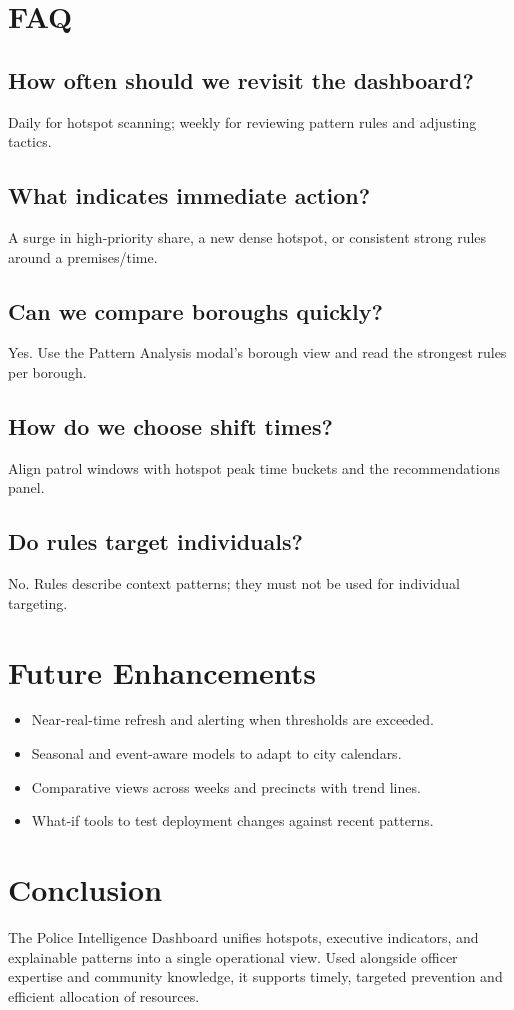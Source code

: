 \documentclass[11pt]{article}
\begin{document}
\section{FAQ}

\subsection*{How often should we revisit the dashboard?}
Daily for hotspot scanning; weekly for reviewing pattern rules and adjusting tactics.

\subsection*{What indicates immediate action?}
A surge in high-priority share, a new dense hotspot, or consistent strong rules around a premises/time.

\subsection*{Can we compare boroughs quickly?}
Yes. Use the Pattern Analysis modal's borough view and read the strongest rules per borough.

\subsection*{How do we choose shift times?}
Align patrol windows with hotspot peak time buckets and the recommendations panel.

\subsection*{Do rules target individuals?}
No. Rules describe context patterns; they must not be used for individual targeting.

\section{Future Enhancements}
\begin{itemize}[leftmargin=*]
  \item Near-real-time refresh and alerting when thresholds are exceeded.
  \item Seasonal and event-aware models to adapt to city calendars.
  \item Comparative views across weeks and precincts with trend lines.
  \item What-if tools to test deployment changes against recent patterns.
\end{itemize}

\section{Conclusion}
The Police Intelligence Dashboard unifies hotspots, executive indicators, and explainable patterns into a single operational view. Used alongside officer expertise and community knowledge, it supports timely, targeted prevention and efficient allocation of resources.
\end{document}
